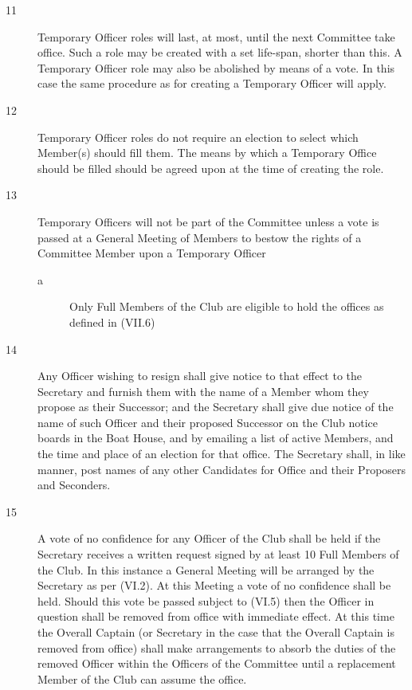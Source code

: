 \documentclass{article}
\begin{document}
\begin{description}
\begin{description}
		\item[11] Temporary Officer roles will last, at most, until the next Committee take
		office. Such a role may be created with a set life-span, shorter than this. A
		Temporary Officer role may also be abolished by means of a vote. In this case
		the same procedure as for creating a Temporary Officer will apply.\\
		
		\item[12] Temporary Officer roles do not require an election to select which Member(s)
		should fill them. The means by which a Temporary Office should be filled
		should be agreed upon at the time of creating the role.\\
		
		\item[13] Temporary Officers will not be part of the Committee unless a vote is passed
		at a General Meeting of Members to bestow the rights of a Committee
		Member upon a Temporary Officer
		\begin{description}
			\item[a] Only Full Members of the Club are eligible to hold the offices as
			defined in (VII.6)\\
		\end{description}
	
		\item[14] Any Officer wishing to resign shall give notice to that effect to the Secretary
		and furnish them with the name of a Member whom they propose as their
		Successor; and the Secretary shall give due notice of the name of such Officer
		and their proposed Successor on the Club notice boards in the Boat House, and
		by emailing a list of active Members, and the time and place of an election for
		that office. The Secretary shall, in like manner, post names of any other
		Candidates for Office and their Proposers and Seconders.\\
		
		\item[15] A vote of no confidence for any Officer of the Club shall be held if the
		Secretary receives a written request signed by at least 10 Full Members of the
		Club. In this instance a General Meeting will be arranged by the Secretary as
		per (VI.2). At this Meeting a vote of no confidence shall be held. Should this
		vote be passed subject to (VI.5) then the Officer in question shall be removed
		from office with immediate effect. At this time the Overall Captain (or
		Secretary in the case that the Overall Captain is removed from office) shall
		make arrangements to absorb the duties of the removed Officer within the
		Officers of the Committee until a replacement Member of the Club can
		assume the office.\\
		

\end{description}
\end{description}
\end{document}
